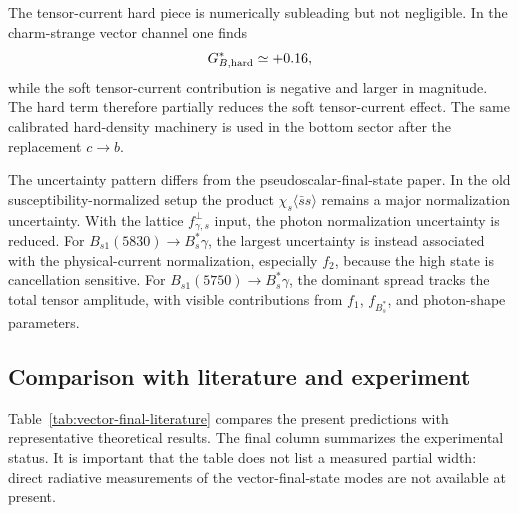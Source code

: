\documentclass[aps,prd,a4paper,preprint,preprintnumbers,titlepage,
nofootinbib,superscriptaddress]{revtex4-2}
\newcommand{\Bst}{B_s^\ast}
\newcommand{\Bsone}{B_{s1}}
\newcommand{\ssbar}{\langle\bar s s\rangle}
\newcommand{\fgammas}{f_{\gamma,s}^{\perp}}
\begin{document}
The tensor-current hard piece is numerically subleading but not negligible.
In the charm-strange vector channel one finds
\[
  G_{B,{\rm hard}}^\ast\simeq +0.16 ,
\]
while the soft tensor-current contribution is negative and larger in
magnitude.  The hard term therefore partially reduces the soft tensor-current
effect.  The same calibrated hard-density machinery is used in the bottom
sector after the replacement \(c\to b\).

The uncertainty pattern differs from the pseudoscalar-final-state paper.  In
the old susceptibility-normalized setup the product
\(\chi_s\ssbar\) remains a major normalization uncertainty.  With the lattice
\(\fgammas\) input, the photon normalization uncertainty is reduced.  For
\(\Bsone(5830)\to\Bst\gamma\), the largest uncertainty is instead associated
with the physical-current normalization, especially \(f_2\), because the high
state is cancellation sensitive.  For \(B_{s1}(5750)\to\Bst\gamma\), the
dominant spread tracks the total tensor amplitude, with visible contributions
from \(f_1\), \(f_{\Bst}\), and photon-shape parameters.

\subsection{Comparison with literature and experiment}
\label{subsec:comparison}

Table~\ref{tab:vector-final-literature} compares the present predictions with
representative theoretical results.  The final column summarizes the
experimental status.  It is important that the table does not list a measured
partial width: direct radiative measurements of the vector-final-state modes
are not available at present.
\end{document}
